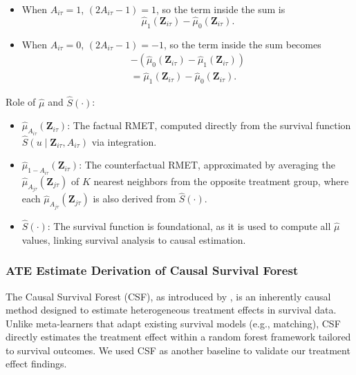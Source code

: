 \begin{enumerate}
\begin{itemize}
   \item When $ A_{i\tau} = 1 $, $ (2 A_{i\tau} - 1) = 1 $, so the term inside the sum is $$ \widehat{\mu}_{1}(\mathbf{Z}_{i\tau}) - \widehat{\mu}_{0}(\mathbf{Z}_{i\tau}). $$
   \item When $ A_{i\tau} = 0 $, $ (2 A_{i\tau} - 1) = -1 $, so the term inside the sum becomes 
   \begin{align*} -(\widehat{\mu}_{0}(\mathbf{Z}_{i\tau}) - \widehat{\mu}_{1}(\mathbf{Z}_{i\tau})) \\ = \widehat{\mu}_{1}(\mathbf{Z}_{i\tau}) - \widehat{\mu}_{0}(\mathbf{Z}_{i\tau}).
   \end{align*}
    \end{itemize}
\end{enumerate}

Role of $ \widehat{\mu} $ and $ \widehat{S}(\cdot) $:
\begin{itemize}
\item $ \widehat{\mu}_{A_{i\tau}}(\mathbf{Z}_{i\tau}) $: The factual RMET, computed directly from the survival function $ \widehat{S}(u \mid \mathbf{Z}_{i\tau}, A_{i\tau}) $ via integration.
\item $ \widehat{\mu}_{1 - A_{i\tau}}(\mathbf{Z}_{i\tau}) $: The counterfactual RMET, approximated by averaging the $ \widehat{\mu}_{A_{j\tau}}(\mathbf{Z}_{j\tau}) $ of $ K $ nearest neighbors from the opposite treatment group, where each $ \widehat{\mu}_{A_{j\tau}}(\mathbf{Z}_{j\tau}) $ is also derived from $ \widehat{S}(\cdot) $.
\item $ \widehat{S}(\cdot) $: The survival function is foundational, as it is used to compute all $ \widehat{\mu} $ values, linking survival analysis to causal estimation.
\end{itemize}

\subsubsection{ATE Estimate Derivation of Causal Survival Forest}
\label{ch03:apd:csf_ate_derivation}
The Causal Survival Forest (CSF), as introduced by \citet{cui2023estimating}, is an inherently causal method designed to estimate heterogeneous treatment effects in survival data.
Unlike meta-learners that adapt existing survival models (e.g., matching), CSF directly estimates the treatment effect within a random forest framework tailored to survival outcomes.
We used CSF as another baseline to validate our treatment effect findings.

